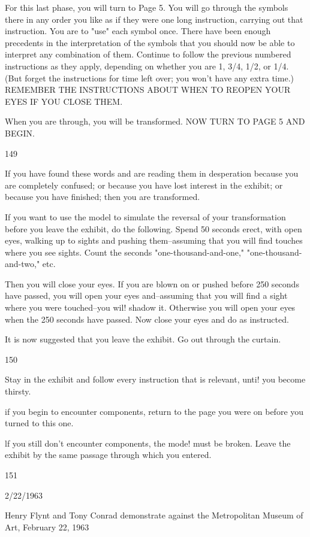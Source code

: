 \documentclass[10pt,twoside]{memoir}
\begin{document}
\begin{enumerate}
{\begin{enumerate}
\begin{sysrules}
\begin{sysrules}
\begin{sysrules}
\begin{sysrules}
{\begin{enumerate}
\begin{sysrules}
\begin{enumerate}
For this last phase, you will turn to Page 5. You will go through the 
symbols there in any order you like as if they were one long instruction, 
carrying out that instruction. You are to "use" each symbol once. There 
have been enough precedents in the interpretation of the symbols that you 
should now be able to interpret any combination of them. Continue to 
follow the previous numbered instructions as they apply, depending on 
whether you are 1, 3/4, 1/2, or 1/4. (But forget the instructions for time left 
over; you won't have any extra time.) REMEMBER THE INSTRUCTIONS 
ABOUT WHEN TO REOPEN YOUR EYES IF YOU CLOSE THEM. 


When you are through, you will be transformed. NOW TURN TO 
PAGE 5 AND BEGIN. 


149 


If you have found these words and are reading them in desperation 
because you are completely confused; or because you have lost interest in 
the exhibit; or because you have finished; then you are transformed. 


If you want to use the model to simulate the reversal of your 
transformation before you leave the exhibit, do the following. Spend 50 
seconds erect, with open eyes, walking up to sights and pushing 
them--assuming that you will find touches where you see sights. Count the 
seconds "one-thousand-and-one," "one-thousand-and-two," etc. 


Then you will close your eyes. If you are blown on or pushed before 
250 seconds have passed, you will open your eyes and--assuming that you 
will find a sight where you were touched--you wil! shadow it. Otherwise you 
will open your eyes when the 250 seconds have passed. Now close your eyes 
and do as instructed. 


It is now suggested that you leave the exhibit. Go out through the 
curtain. 


150 


Stay in the exhibit and follow every instruction that is relevant, unti! 
you become thirsty. 


if you begin to encounter components, return to the page you were on 
before you turned to this one. 


lf you still don't encounter components, the mode! must be broken. 
Leave the exhibit by the same passage through which you entered. 


151 


2/22/1963 


Henry Flynt and Tony Conrad demonstrate against the Metropolitan Museum of Art, 
February 22, 1963 



\end{enumerate}
\end{sysrules}
\end{enumerate}}
\end{sysrules}
\end{sysrules}
\end{sysrules}
\end{sysrules}
\end{enumerate}}
\end{enumerate}
\end{document}
